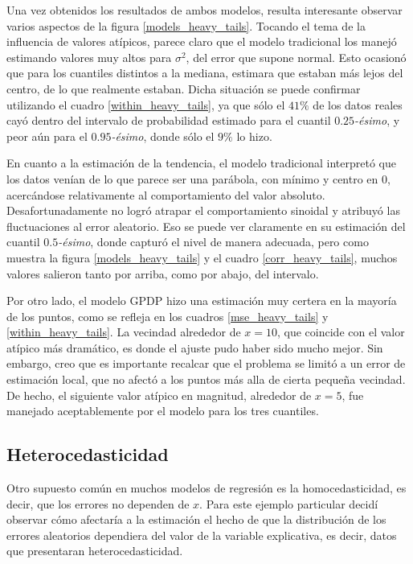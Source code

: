 Una vez obtenidos los resultados de ambos modelos, resulta interesante observar varios aspectos de la figura \ref{models_heavy_tails}. Tocando el tema de la influencia de valores at\'ipicos, parece claro que el modelo tradicional los manej\'o estimando valores muy altos para $\sigma^2$, del error que supone normal. Esto ocasion\'o que para los cuantiles distintos a la mediana, estimara que estaban m\'as lejos del centro, de lo que realmente estaban. Dicha situaci\'on se puede confirmar utilizando el cuadro \ref{within_heavy_tails}, ya que s\'olo el $41\%$ de los datos reales cay\'o dentro del intervalo de probabilidad estimado para el cuantil $0.25$\textit{-\'esimo}, y peor a\'un para el $0.95$\textit{-\'esimo}, donde s\'olo el $9\%$ lo hizo.

En cuanto a la estimaci\'on de la tendencia, el modelo tradicional interpret\'o que los datos ven\'ian de lo que parece ser una par\'abola, con m\'inimo y centro en 0, acerc\'andose relativamente al comportamiento del valor absoluto. Desafortunadamente no logr\'o atrapar el comportamiento sinoidal y atribuy\'o las fluctuaciones al error aleatorio. Eso se puede ver claramente en su estimaci\'on del cuantil $0.5$\textit{-\'esimo}, donde captur\'o el nivel de manera adecuada, pero como muestra la figura \ref{models_heavy_tails} y el cuadro \ref{corr_heavy_tails}, muchos valores salieron tanto por arriba, como por abajo, del intervalo.

Por otro lado, el modelo GPDP hizo una estimaci\'on muy certera en la mayor\'ia de los puntos, como se refleja en los cuadros \ref{mse_heavy_tails} y \ref{within_heavy_tails}. La vecindad alrededor de $x = 10$, que coincide con el valor at\'ipico m\'as dram\'atico, es donde el ajuste pudo haber sido mucho mejor. Sin embargo, creo que es importante recalcar que el problema se limit\'o a un error de estimaci\'on local, que no afect\'o a los puntos m\'as alla de cierta pequeña vecindad. De hecho, el siguiente valor at\'ipico en magnitud, alrededor de $x = 5$, fue manejado aceptablemente por el modelo para los tres cuantiles.

\subsection{Heterocedasticidad}

Otro supuesto com\'un en muchos modelos de regresi\'on es la homocedasticidad, es decir, que los errores no dependen de $x$. Para este ejemplo particular decid\'i observar c\'omo afectar\'ia a la estimaci\'on el hecho de que la distribuci\'on de los errores aleatorios dependiera del valor de la variable explicativa, es decir, datos que presentaran heterocedasticidad.

